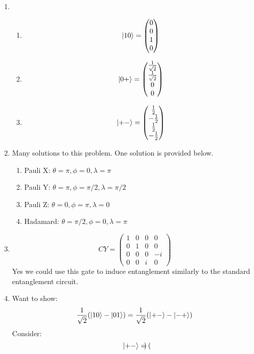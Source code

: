 \documentclass[12pt]{article}
\begin{document}
\begin{enumerate}[font=\bfseries]
    \item \begin{enumerate}
            \item \[\ket{10} = \begin{pmatrix} 0 \\ 0 \\ 1 \\0          \end{pmatrix}\]
            \item \[\ket{0+} = \begin{pmatrix} \frac{1}{\sqrt{2}} \\ \frac{1}{\sqrt{2}} \\ 0 \\0          \end{pmatrix}\]
            \item \[\ket{+-} = \begin{pmatrix} \frac{1}{2} \\ -\frac{1}{2} \\ \frac{1}{2} \\ -\frac{1}{2}         \end{pmatrix}\]
        \end{enumerate}
    \item Many solutions to this problem. One solution is provided below.
        \begin{enumerate}
            \item Pauli X: $\theta=\pi,\phi=0,\lambda=\pi$
            \item Pauli Y: $\theta=\pi,\phi=\pi/2,\lambda=\pi/2$
            \item Pauli Z: $\theta=0,\phi=\pi,\lambda=0$
            \item Hadamard: $\theta=\pi/2,\phi=0,\lambda=\pi$
        \end{enumerate}
    \item 
        \[CY = \begin{pmatrix} 
        1 & 0 & 0 & 0 \\
        0 & 1 & 0 & 0 \\
        0 & 0 & 0 & -i \\
        0 & 0 & i & 0
        \end{pmatrix} \]
        Yes we could use this gate to induce entanglement similarly to the standard entanglement circuit.
    \item Want to show:
    \[\frac{1}{\sqrt{2}}(\ket{10} - \ket{01}) = \frac{1}{\sqrt{2}}(\ket{+-} - \ket{-+})\]
    Consider:
    \[\ket{+-} = \begin{pmatrix}

\end{pmatrix}\]
\end{enumerate}
\end{document}
